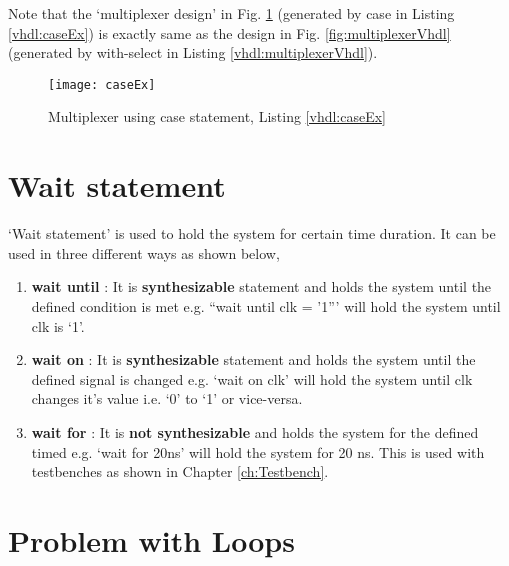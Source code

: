 \begin{noNumBox}
	Note that the `multiplexer design' in Fig. \ref{fig:caseEx} (generated by case in Listing \ref{vhdl:caseEx}) is exactly same as the design in Fig. \ref{fig:multiplexerVhdl} (generated by with-select in Listing \ref{vhdl:multiplexerVhdl}). 
\end{noNumBox}



\begin{figure}
	\centering
	\texttt{[image: caseEx]}
	\caption{Multiplexer using case statement, Listing \ref{vhdl:caseEx}}
	\label{fig:caseEx}
\end{figure}

\section{Wait statement}
`Wait statement' is used to hold the system for certain time duration. It can be used in three different ways as shown below, 

\begin{enumerate}
	\item \textbf{wait until} : It is \textbf{synthesizable} statement and holds the system until the defined condition is met e.g. ``wait until clk = '1''' will hold the system until clk is `1'. 
	
	\item \textbf{wait on} : It is \textbf{synthesizable} statement and holds the system until the defined signal is changed e.g. `wait on clk' will hold the system until clk changes it's value i.e. `0' to `1' or vice-versa.
	
	\item \textbf{wait for} : It is \textbf{not synthesizable} and holds the system for the defined timed e.g. `wait for 20ns' will hold the system for 20 ns. This is used with testbenches as shown in Chapter \ref{ch:Testbench}.
\end{enumerate}

\section{Problem with Loops}

